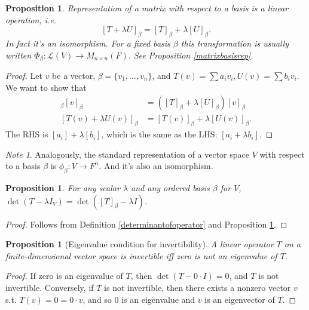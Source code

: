 \documentclass[12pt]{article}
\theoremstyle{plain}
\newtheorem{proposition}[theorem]{Proposition}
\theoremstyle{definition}
\theoremstyle{remark}
\newtheorem{note}[theorem]{Note}
\begin{document}
\begin{proposition}\label{changeofbasislinear}
Representation of a matrix with respect to a basis is a linear operation, i.e. $$[T + \lambda U]_\beta = [T]_\beta + \lambda[U]_\beta.$$ In fact it's an isomorphism. For a fixed basis $\beta$ this transformation is usually written $\Phi_\beta: \mathcal{L}(V) \longrightarrow M_{n\times n}(F).$ See Proposition \ref{matrixbasisrep}.
\end{proposition}

\begin{proof}
Let $v$ be a vector, $\beta = \{v_1,\ldots, v_n\}$, and $T(v) = \sum a_i v_i, U(v) = \sum b_i v_i$. We want to show that
\begin{align*}
[T + \lambda U]_\beta [v]_\beta &= ([T]_\beta + \lambda[U]_\beta)[v]_\beta \\
[T(v) + \lambda U(v)]_\beta &= [T(v)]_\beta + \lambda[U(v)]_\beta.
\end{align*}
The RHS is $[a_i] + \lambda [b_i]$, which is the same as the LHS: $[a_i + \lambda b_i]$.
\end{proof}

\begin{note}
Analogously, the standard representation of a vector space $V$ with respect to a basis $\beta$ is $\phi_\beta: V \longrightarrow F^n.$ And it's also an isomorphism.
\end{note}

\begin{proposition}
For any scalar $\lambda$ and any ordered basis $\beta$ for $V$, $\det(T - \lambda I_V) = \det([T]_\beta - \lambda I)$.
\end{proposition}

\begin{proof}
Follows from Definition \ref{determinantofoperator} and Proposition \ref{changeofbasislinear}.
\end{proof}

\begin{proposition}[Eigenvalue condition for invertibility]
A linear operator $T$ on a finite-dimensional vector space is invertible iff zero is not an eigenvalue of $T$.
\end{proposition}

\begin{proof}
If zero is an eigenvalue of $T$, then $\det(T - 0 \cdot I) = 0$, and $T$ is not invertible. Conversely, if $T$ is not invertible, then there exists a nonzero vector $v$ s.t. $T(v) = 0 = 0 \cdot v$, and so 0 is an eigenvalue and $v$ is an eigenvector of $T$.
\end{proof}
\end{document}
